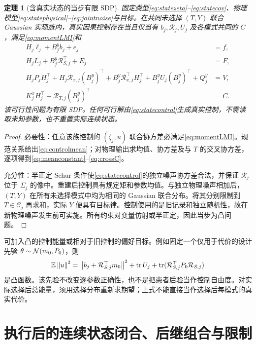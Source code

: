 \documentclass[UTF8,fontset=fandol,11pt,a4paper]{ctexart}
\newcommand{\norm}[1]{\left\lVert#1\right\rVert}\newcommand{\gam}[1]{\gamma_{#1}}
\newtheorem{theorem}{定理}[section]\newtheorem{lemma}[theorem]{引理}
\theoremstyle{definition}\newtheorem{definition}[theorem]{定义}\newtheorem{assumption}[theorem]{条件}
\numberwithin{equation}{section}
\begin{document}
\begin{theorem}[含真实状态的当步有限 SDP]
\label{thm:statecompile}
固定类型\eqref{eq:statezeta}--\eqref{eq:statecov}、物理模型\eqref{eq:statephysical}--\eqref{eq:jointnoise}与目标。在共同未选择 $(T,Y)$ 联合 Gaussian 实现族内，真实因果控制存在当且仅当有 $b_j,\mathcal R_j,U_j$ 及各模式共同的 $C$，满足\eqref{eq:momentLMI}和
\begin{align}
H_j\ell_j+B_j^yb_j+e_j&=f,\label{eq:meanconstant}\\
H_jL_j+B_j^y\mathcal R_{S,j}^\top+E_j&=F,\label{eq:meanslope}\\
H_jP_jH_j^\top+H_j\mathcal R_{x,j}(B_j^y)^\top
+B_j^y\mathcal R_{x,j}^\top H_j^\top
+B_j^yU_j(B_j^y)^\top+Q_j^y&=V,\label{eq:outputcov}\\
K_j^xH_j^\top+\mathcal R_{T,j}(B_j^y)^\top&=C.\label{eq:crossC}
\end{align}
该可行性问题为有限 SDP。任何可行解由\eqref{eq:statecontrol}生成真实控制，不需读取未知参数，也不重置实际连续状态。
\end{theorem}
\begin{proof}
必要性：任意该族控制的 $(\zeta_j,u)$ 联合协方差必满足\eqref{eq:momentLMI}。规范关系给出\eqref{eq:controlmean}；对物理输出求均值、协方差及与 $T$ 的交叉协方差，逐项得到\eqref{eq:meanconstant}--\eqref{eq:crossC}。

充分性：半正定 Schur 条件使\eqref{eq:statecontrol}的独立噪声协方差合法，并保证 $\mathcal R_j$ 位于 $\Sigma_j$ 的像中。重建后控制具有规定矩和参数均值。与独立物理噪声相加后，$(T,Y)$ 在所有未选择模式中均为相同的 Gaussian 联合分布。将其分别限制到 $T\in\mathcal C_j$ 再求和，实际 $Y$ 便具有目标律。控制使用的是旧记录和独立随机性，故在新物理噪声发生前可实施。所有约束对变量仿射或半正定，因此当步为凸问题。
\end{proof}

可加入凸的控制能量或相对于旧控制的偏好目标。例如固定一个仅用于代价的设计先验 $\theta\sim\mathcal N(m_0,P_0)$，则
\[
\E\norm u^2=\norm{b_j+\mathcal R_{S,j}^\top m_0}^2+
\tr U_j+\tr(\mathcal R_{S,j}^\top P_0\mathcal R_{S,j})
\]
是凸函数。该先验不改变逐参数正确性，也不是把患者后验当作控制自由度。对实际选择后总能量，须用选择分布重新求期望；上式不能直接当作选择后每模式的真实代价。

\section{执行后的连续状态闭合、后继组合与限制}
\label{sec:stateupdate}
\end{document}
